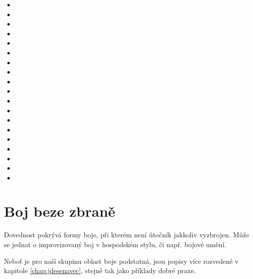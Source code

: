 \documentclass[../main.tex]{subfiles}
\begin{document}
\begin{multicols}{2}
\begin{itemize}
\item {}
\item {}
\item {}
\item {}
\item {}
\item {}
\item {}
\item {}
\item {}
\item {}
\item {}
\item {}
\item {}
\item {}
\item {}
\item {}
\item {}
\item {}
\item {}
\end{itemize}
\end{multicols}


\section{Boj beze zbraně}
\label{sec:bojbezezbrane}

Dovednost  pokrývá formy boje, při kterém není útočník jakkoliv vyzbrojen. Může se jednat o improvizovaný boj v hospodském stylu, či např. bojové umění.

Neboť je pro naší skupinu oblast boje podstatná, jsou popisy více rozvedené v kapitole \ref{chap:jdesenavec}, stejně tak jako příklady dobré praxe.\\
   
\end{document}
